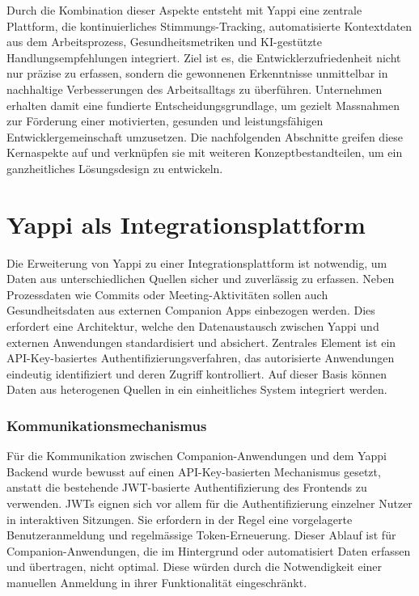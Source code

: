 \documentclass[12pt,a4paper]{report}
\begin{document}
Durch die Kombination dieser Aspekte entsteht mit Yappi eine zentrale Plattform, die kontinuierliches Stimmungs-Tracking,
automatisierte Kontextdaten aus dem Arbeitsprozess, Gesundheitsmetriken und KI-gestützte Handlungsempfehlungen integriert. Ziel ist
es, die Entwicklerzufriedenheit nicht nur präzise zu erfassen, sondern die gewonnenen Erkenntnisse unmittelbar in nachhaltige
Verbesserungen des Arbeitsalltags zu überführen. Unternehmen erhalten damit eine fundierte Entscheidungsgrundlage, um gezielt
Massnahmen zur Förderung einer motivierten, gesunden und leistungsfähigen Entwicklergemeinschaft umzusetzen. Die nachfolgenden
Abschnitte greifen diese Kernaspekte auf und verknüpfen sie mit weiteren Konzeptbestandteilen, um ein ganzheitliches Lösungsdesign
zu entwickeln.

\section{Yappi als Integrationsplattform}

Die Erweiterung von Yappi zu einer Integrationsplattform ist notwendig, um Daten aus unterschiedlichen Quellen sicher und 
zuverlässig zu erfassen. Neben Prozessdaten wie Commits oder Meeting-Aktivitäten sollen auch Gesundheitsdaten aus externen
Companion Apps einbezogen werden. Dies erfordert eine Architektur, welche den Datenaustausch zwischen Yappi und externen Anwendungen
standardisiert und absichert. Zentrales Element ist ein API-Key-basiertes Authentifizierungsverfahren, das autorisierte Anwendungen
eindeutig identifiziert und deren Zugriff kontrolliert. Auf dieser Basis können Daten aus heterogenen Quellen in ein einheitliches
System integriert werden.

\subsubsection{Kommunikationsmechanismus}

Für die Kommunikation zwischen Companion-Anwendungen und dem Yappi Backend wurde bewusst auf einen API-Key-basierten Mechanismus
gesetzt, anstatt die bestehende JWT-basierte Authentifizierung des Frontends zu verwenden. JWTs eignen sich vor allem für die
Authentifizierung einzelner Nutzer in interaktiven Sitzungen. Sie erfordern in der Regel eine vorgelagerte Benutzeranmeldung und
regelmässige Token-Erneuerung. Dieser Ablauf ist für Companion-Anwendungen, die im Hintergrund oder automatisiert Daten erfassen
und übertragen, nicht optimal. Diese würden durch die Notwendigkeit einer manuellen Anmeldung in ihrer Funktionalität eingeschränkt.
\end{document}

